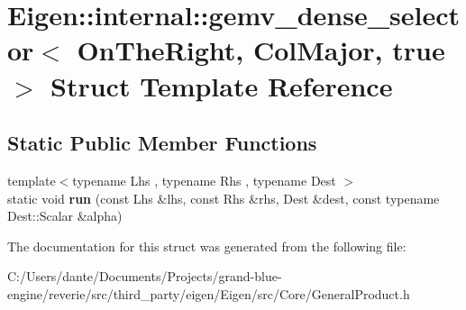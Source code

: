 \hypertarget{struct_eigen_1_1internal_1_1gemv__dense__selector_3_01_on_the_right_00_01_col_major_00_01true_01_4}{}\section{Eigen\+::internal\+::gemv\+\_\+dense\+\_\+selector$<$ On\+The\+Right, Col\+Major, true $>$ Struct Template Reference}
\label{struct_eigen_1_1internal_1_1gemv__dense__selector_3_01_on_the_right_00_01_col_major_00_01true_01_4}
\subsection*{Static Public Member Functions}
\begin{DoxyCompactItemize}
\item 
\mbox{\label{struct_eigen_1_1internal_1_1gemv__dense__selector_3_01_on_the_right_00_01_col_major_00_01true_01_4_ace6cd972a53e1d029ee4a9e32ff68795}} 
{\footnotesize template$<$typename Lhs , typename Rhs , typename Dest $>$ }\\static void {\bfseries run} (const Lhs \&lhs, const Rhs \&rhs, Dest \&dest, const typename Dest\+::\+Scalar \&alpha)
\end{DoxyCompactItemize}


The documentation for this struct was generated from the following file\+:\begin{DoxyCompactItemize}
\item 
C\+:/\+Users/dante/\+Documents/\+Projects/grand-\/blue-\/engine/reverie/src/third\+\_\+party/eigen/\+Eigen/src/\+Core/General\+Product.\+h\end{DoxyCompactItemize}
